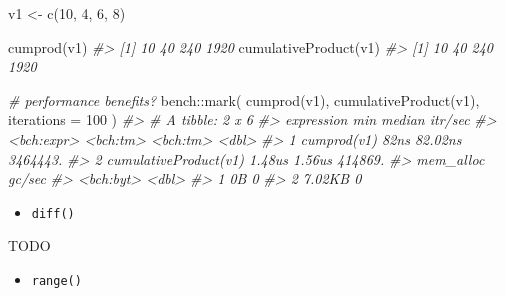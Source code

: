 \documentclass[
]{book}
\newenvironment{Shaded}{\begin{snugshade}}{\end{snugshade}}
\newcommand{\AttributeTok}[1]{\textcolor[rgb]{0.77,0.63,0.00}{#1}}
\newcommand{\CommentTok}[1]{\textcolor[rgb]{0.56,0.35,0.01}{\textit{#1}}}
\newcommand{\DecValTok}[1]{\textcolor[rgb]{0.00,0.00,0.81}{#1}}
\newcommand{\FunctionTok}[1]{\textcolor[rgb]{0.00,0.00,0.00}{#1}}
\newcommand{\NormalTok}[1]{#1}
\newcommand{\OtherTok}[1]{\textcolor[rgb]{0.56,0.35,0.01}{#1}}
\newcommand{\SpecialCharTok}[1]{\textcolor[rgb]{0.00,0.00,0.00}{#1}}
\providecommand{\tightlist}{%
  \setlength{\itemsep}{0pt}\setlength{\parskip}{0pt}}
\begin{document}
\begin{Shaded}
\begin{Highlighting}[]
\NormalTok{v1 }\OtherTok{\textless{}{-}} \FunctionTok{c}\NormalTok{(}\DecValTok{10}\NormalTok{, }\DecValTok{4}\NormalTok{, }\DecValTok{6}\NormalTok{, }\DecValTok{8}\NormalTok{)}

\FunctionTok{cumprod}\NormalTok{(v1)}
\CommentTok{\#\textgreater{} [1]   10   40  240 1920}
\FunctionTok{cumulativeProduct}\NormalTok{(v1)}
\CommentTok{\#\textgreater{} [1]   10   40  240 1920}

\CommentTok{\# performance benefits?}
\NormalTok{bench}\SpecialCharTok{::}\FunctionTok{mark}\NormalTok{(}
  \FunctionTok{cumprod}\NormalTok{(v1),}
  \FunctionTok{cumulativeProduct}\NormalTok{(v1),}
  \AttributeTok{iterations =} \DecValTok{100}
\NormalTok{)}
\CommentTok{\#\textgreater{} \# A tibble: 2 x 6}
\CommentTok{\#\textgreater{}   expression                 min   median \textasciigrave{}itr/sec\textasciigrave{}}
\CommentTok{\#\textgreater{}   \textless{}bch:expr\textgreater{}            \textless{}bch:tm\textgreater{} \textless{}bch:tm\textgreater{}     \textless{}dbl\textgreater{}}
\CommentTok{\#\textgreater{} 1 cumprod(v1)               82ns  82.02ns  3464443.}
\CommentTok{\#\textgreater{} 2 cumulativeProduct(v1)   1.48us   1.56us   414869.}
\CommentTok{\#\textgreater{}   mem\_alloc \textasciigrave{}gc/sec\textasciigrave{}}
\CommentTok{\#\textgreater{}   \textless{}bch:byt\textgreater{}    \textless{}dbl\textgreater{}}
\CommentTok{\#\textgreater{} 1        0B        0}
\CommentTok{\#\textgreater{} 2    7.02KB        0}
\end{Highlighting}
\end{Shaded}

\begin{itemize}
\tightlist
\item
  \texttt{diff()}
\end{itemize}

TODO

\begin{itemize}
\tightlist
\item
  \texttt{range()}
\end{itemize}
\end{document}
